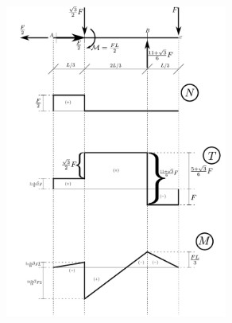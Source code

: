 \begin{figure}[ht]
\centering
\includegraphics[width=0.65\textwidth]{Immagini/Parte_13/Esercizio13_1/figura13_1_3.pdf}
\caption{}
\label{Esercizio13-1-3}
\end{figure}
